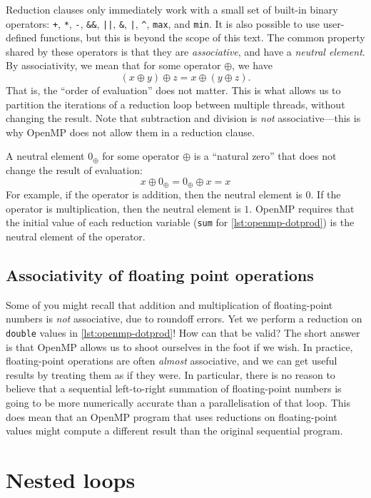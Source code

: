 Reduction clauses only immediately work with a small set of built-in
binary operators: \lstinline{+}, \lstinline{*}, \lstinline{-},
\lstinline{&&}, \lstinline{||}, \lstinline{&}, \lstinline{|},
\lstinline{^}, \lstinline{max}, and \lstinline{min}.  It is also
possible to use user-defined functions, but this is beyond the scope
of this text.  The common property shared by these operators is that
they are \emph{associative}, and have a \emph{neutral element}.  By
associativity, we mean that for some operator $\oplus$, we have
\[
  (x \oplus y) \oplus z = x \oplus (y \oplus z).
\]
That is, the ``order of evaluation'' does not matter.  This is what
allows us to partition the iterations of a reduction loop between
multiple threads, without changing the result.  Note that subtraction
and division is \emph{not} associative---this is why OpenMP does not
allow them in a reduction clause.

A neutral element $0_{\oplus}$ for some operator $\oplus$ is a
``natural zero'' that does not change the result of evaluation:
\[
  x \oplus 0_{\oplus} = 0_{\oplus} \oplus x = x
\]
For example, if the operator is addition, then the neutral element is
$0$.  If the operator is multiplication, then the neutral element is
$1$.  OpenMP requires that the initial value of each reduction
variable (\lstinline{sum} for \cref{lst:openmp-dotprod}) is the
neutral element of the operator.

\subsection{Associativity of floating point operations}

Some of you might recall that addition and multiplication of
floating-point numbers is \emph{not} associative, due to roundoff
errors.  Yet we perform a reduction on \lstinline{double} values in
\cref{lst:openmp-dotprod}!  How can that be valid?  The short answer
is that OpenMP allows us to shoot ourselves in the foot if we wish.
In practice, floating-point operations are often \emph{almost}
associative, and we can get useful results by treating them as if they
were.  In particular, there is no reason to believe that a sequential
left-to-right summation of floating-point numbers is going to be more
numerically accurate than a parallelisation of that loop.  This does
mean that an OpenMP program that uses reductions on floating-point
values might compute a different result than the original sequential
program.

\section{Nested loops}
\label{sec:openmp-nesting}

